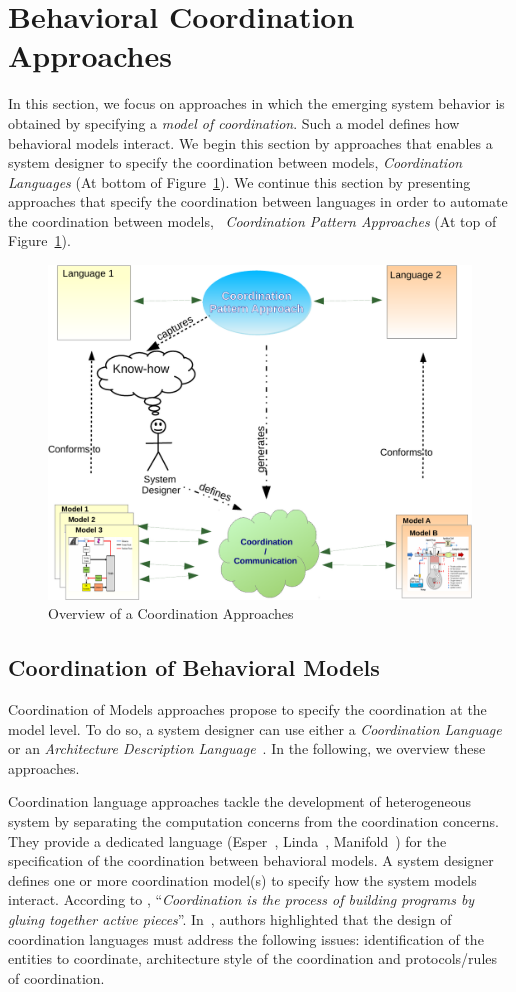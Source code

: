 \section{Behavioral Coordination Approaches}

In this section, we focus on approaches in which the emerging system behavior is obtained by specifying a \emph{model of coordination}. Such a model defines how behavioral models interact. We begin this section by approaches that enables a system designer to specify the coordination between models, \ie \emph{Coordination Languages} (At bottom of Figure~\ref{fig:coordapp}). We continue this section by presenting approaches that specify the coordination between languages in order to automate the coordination between models, \ie~\emph{Coordination Pattern Approaches} (At top of Figure~\ref{fig:coordapp}).

\begin{figure}
      \begin{center}
         			\includegraphics[width=0.6\columnwidth]{background/figs/coordpatterapp}
         			\caption{Overview of a Coordination Approaches}
         			\label{fig:coordapp}
        \end{center}
\end{figure}


\subsection{Coordination of Behavioral Models}
Coordination of Models approaches propose to specify the coordination at the model level. To do so, a system designer can use either a \emph{Coordination Language}~\cite{coordmodels} or an \emph{Architecture Description Language}~\cite{frameadlsbib}. In the following, we overview these approaches. 
			 
Coordination language approaches tackle the development of heterogeneous system by separating the computation concerns from the coordination concerns. They provide a dedicated language (\eg Esper~\cite{esperbib}, Linda~\cite{lindabib}, Manifold~\cite{manifoldbib}) for the specification of the coordination between behavioral models. A system designer defines one or more coordination model(s) to specify how the system models interact. According to \cite{coordsignibib}, ``\textit{Coordination is the process of building programs by gluing together active pieces}''. In~\cite{wegnercoorbib}, authors highlighted that the design of coordination languages must address the following issues: identification of the entities to coordinate, architecture style of the coordination and protocols/rules of coordination.

